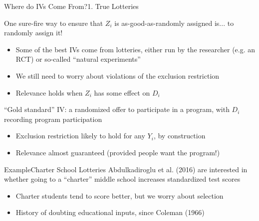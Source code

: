 \documentclass{beamer}
\begin{document}
\begin{frame}{Where do IVs Come From?}{1. True Lotteries}

One sure-fire way to ensure that $Z_i$ is as-good-as-randomly assigned is... \pause to randomly assign it!\pause

\begin{itemize}
  \item Some of the best IVs come from lotteries, either run by the researcher (e.g. an RCT) or so-called ``natural experiments''

  \item We still need to worry about violations of the exclusion restriction

  \item Relevance holds when $Z_i$ has some effect on $D_i$
\end{itemize}\pause
\medskip

``Gold standard'' IV: a randomized offer to participate in a program, with $D_i$ recording program participation
\begin{itemize}
  \item Exclusion restriction likely to hold for any $Y_i$, by construction

  \item Relevance almost guaranteed (provided people want the program!)
\end{itemize}

\end{frame}

\begin{frame}{Example}{Charter School Lotteries}
Abdulkadiroglu et al. (2016) are interested in whether going to a ``charter'' middle school increases standardized test scores
\begin{itemize}
  \item Charter students tend to score better, but we worry about selection

  \item History of doubting educational inputs, since Coleman (1966)
\end{itemize}
\end{frame}
\end{document}
